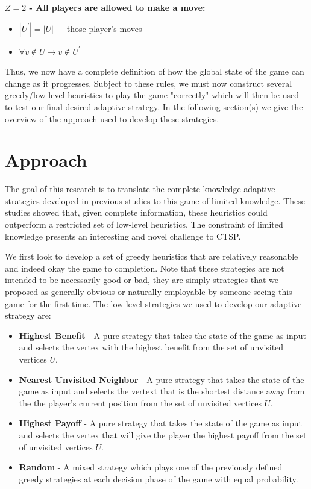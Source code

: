 \documentclass[pageno]{jpaper}
\begin{document}
\textbf{$Z = 2$ - All players are allowed to make a move:}\newline

\begin{itemize}
	\item $| U^{\prime} | = | U | - $ those player's moves
	\item $\forall v \notin U \rightarrow v \notin U^{\prime}$
\end{itemize}

Thus, we now have a complete definition of how the global state of the game can change as it progresses. Subject to these rules, we must now construct several greedy/low-level heuristics to play the game "correctly" which will then be used to test our final desired adaptive strategy. In the following section(s) we give the overview of the approach used to develop these strategies.\newline

\section{Approach}

The goal of this research is to translate the complete knowledge adaptive strategies developed in previous studies to this game of limited knowledge. These studies showed that, given complete information, these heuristics could outperform a restricted set of low-level heuristics. The constraint of limited knowledge presents an interesting and novel challenge to CTSP.\par 

We first look to develop a set of greedy heuristics that are relatively reasonable and indeed okay the game to completion. Note that these strategies are not intended to be necessarily good or bad, they are simply strategies that we proposed as generally obvious or naturally employable by someone seeing this game for the first time. The low-level strategies we used to develop our adaptive strategy are:\newpage

\begin{itemize}
	\item \textbf{Highest Benefit} - A pure strategy that takes the state of the game as input and selects the vertex with the highest benefit from the set of unvisited vertices $U$.
	
	\item \textbf{Nearest Unvisited Neighbor} - A pure strategy that takes the state of the game as input and selects the vertext that is the shortest distance away from the the player's current position from the set of unvisited vertices $U$.
	
	\item \textbf{Highest Payoff} - A pure strategy that takes the state of the game as input and selects the vertex that will give the player the highest payoff from the set of unvisited vertices $U$.
	
	\item \textbf{Random} - A mixed strategy which plays one of the previously defined greedy strategies at each decision phase of the game with equal probability.\newline
\end{itemize}
\end{document}
